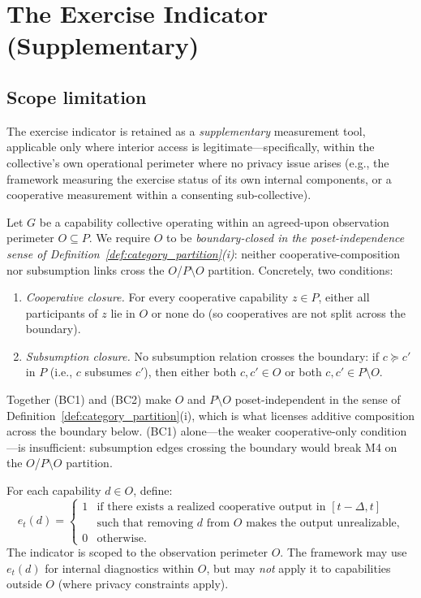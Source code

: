 \section{The Exercise Indicator (Supplementary)}
\label{app:exercise_indicator}

\subsection{Scope limitation}

The exercise indicator is retained as a \emph{supplementary}
measurement tool, applicable only where interior access is
legitimate---specifically, within the
collective's own operational perimeter where no privacy issue
arises (e.g., the framework measuring the exercise status of its
own internal components, or a cooperative measurement within a
consenting sub-collective).

\begin{definition}
\label{def:exercise_indicator}
Let $G$ be a capability collective operating within an
agreed-upon observation perimeter $O \subseteq P$.  We require
$O$ to be \emph{boundary-closed in the poset-independence sense
of Definition~\ref{def:category_partition}(i)}: neither
cooperative-composition nor subsumption links cross the
$O$/$P \setminus O$ partition.  Concretely, two conditions:
\begin{enumerate}
\item[(BC1)] \emph{Cooperative closure.}  For every cooperative
  capability $z \in P$, either all participants of $z$ lie in
  $O$ or none do (so cooperatives are not split across the
  boundary).
\item[(BC2)] \emph{Subsumption closure.}  No subsumption
  relation crosses the boundary: if $c \succeq c'$ in $P$ (i.e.,
  $c$ subsumes $c'$), then either both $c, c' \in O$ or both
  $c, c' \in P \setminus O$.
\end{enumerate}
Together (BC1) and (BC2) make $O$ and $P \setminus O$
poset-independent in the sense of
Definition~\ref{def:category_partition}(i), which is what
licenses additive composition across the boundary below.  (BC1)
alone---the weaker cooperative-only condition---is insufficient:
subsumption edges crossing the boundary would break M4 on the
$O$/$P \setminus O$ partition.

For each capability $d \in O$, define:
\[
  e_t(d) = \begin{cases}
  1 & \text{if there exists a realized cooperative output in
    $[t - \Delta, t]$} \\
    & \text{such that removing $d$ from $O$ makes the output
      unrealizable,} \\
  0 & \text{otherwise.}
  \end{cases}
\]
The indicator is scoped to the observation perimeter $O$.  The
framework may use $e_t(d)$ for internal diagnostics within $O$,
but may \emph{not} apply it to capabilities outside $O$ (where
privacy constraints apply).
\end{definition}

